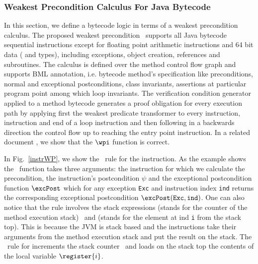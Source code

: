 \subsubsection{Weakest Precondition Calculus For Java
Bytecode}\label{wpbc} In this section, we define a bytecode logic in
terms of a weakest precondition calculus. The proposed weakest
precondition \wpi \ supports all Java bytecode sequential instructions
except for floating point arithmetic instructions and 64 bit data
( and  types), including exceptions, object
creation, references and subroutines. The calculus is defined over the
method control flow graph and supports BML annotation, i.e. bytecode
method's specification like preconditions, normal and exceptional
postconditions, class invariants, assertions at particular program
point among which loop invariants. The verification condition
generator applied to a method bytecode generates a proof obligation
for every execution path by applying first the weakest predicate
transformer to every  instruction, 
instruction and end of a loop instruction and then following in a
backwards direction the control flow up to reaching the entry point
instruction. In a related document \cite{JBL05MP}, we show that the
$\wpi$ function is correct.


 In Fig.~\ref{instrWP}, we show the \wpi \ rule for the  instruction.
 As the example shows the \wpi \ function takes three arguments:
the instruction for which we calculate the precondition, 
the instruction's postcondition $\psi$ and the exceptional postcondition function $\excPost$ which for any exception \texttt{Exc} and 
instruction index \texttt{ind} returns the
corresponding exceptional postcondition $\excPost(\texttt{Exc}, \tt{ind})$. One can also notice that the rule involves the stack expressions \counter 
(stands for the counter of the method execution stack) \ and  (stands for the element at ind \texttt{i} from the stack top).
 This is because the JVM is stack based and the instructions take their arguments from the method execution stack and 
 put the result on the stack.
 The \wpi \ rule for   increments the stack counter \counter \ and loads on the stack top the contents
 of the local variable $\register{i}$. 




